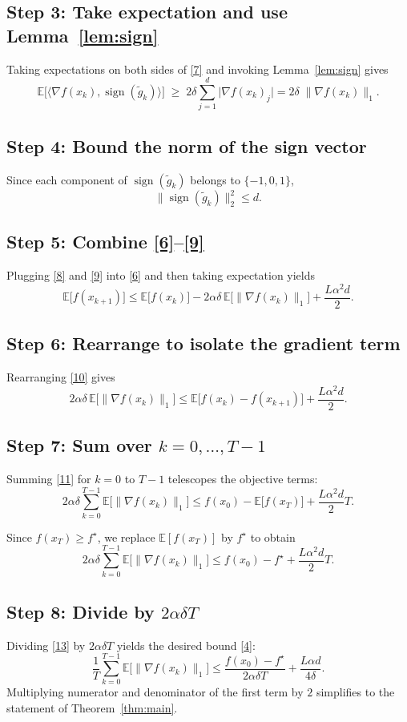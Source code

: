 \documentclass{article}
\newcommand{\sign}{\operatorname{sign}}
\newcommand{\E}{\mathbb{E}}
\begin{document}
\subsection*{Step 3: Take expectation and use Lemma~\ref{lem:sign}}
Taking expectations on both sides of \eqref{7} and invoking Lemma~\ref{lem:sign} gives
\[
\E\bigl[\langle\nabla f(x_{k}),\sign(\tilde g_{k})\rangle\bigr]
\;\ge\;2\delta\sum_{j=1}^{d}\bigl|\nabla f(x_{k})_{j}\bigr|
=2\delta\;\|\nabla f(x_{k})\|_{1}.
\tag{8}
\]

\subsection*{Step 4: Bound the norm of the sign vector}
Since each component of $\sign(\tilde g_{k})$ belongs to $\{-1,0,1\}$,
\[
\|\sign(\tilde g_{k})\|_{2}^{2}\le d.
\tag{9}
\]

\subsection*{Step 5: Combine \eqref{6}–\eqref{9}}
Plugging \eqref{8} and \eqref{9} into \eqref{6} and then taking expectation yields
\[
\E\bigl[f(x_{k+1})\bigr]
\le \E\bigl[f(x_{k})\bigr]
-2\alpha\delta\,\E\!\bigl[\|\nabla f(x_{k})\|_{1}\bigr]
+\frac{L\alpha^{2}d}{2}.
\tag{10}
\]

\subsection*{Step 6: Rearrange to isolate the gradient term}
Rearranging \eqref{10} gives
\[
2\alpha\delta\,\E\!\bigl[\|\nabla f(x_{k})\|_{1}\bigr]
\le \E\bigl[f(x_{k})-f(x_{k+1})\bigr]
+\frac{L\alpha^{2}d}{2}.
\tag{11}
\]

\subsection*{Step 7: Sum over $k=0,\dots,T-1$}
Summing \eqref{11} for $k=0$ to $T-1$ telescopes the objective terms:
\[
2\alpha\delta\sum_{k=0}^{T-1}\E\!\bigl[\|\nabla f(x_{k})\|_{1}\bigr]
\le f(x_{0})- \E\bigl[f(x_{T})\bigr] + \frac{L\alpha^{2}d}{2}T.
\tag{12}
\]

Since $f(x_{T})\ge f^{\star}$, we replace $\E[f(x_{T})]$ by $f^{\star}$ to obtain
\[
2\alpha\delta\sum_{k=0}^{T-1}\E\!\bigl[\|\nabla f(x_{k})\|_{1}\bigr]
\le f(x_{0})-f^{\star}+ \frac{L\alpha^{2}d}{2}T.
\tag{13}
\]

\subsection*{Step 8: Divide by $2\alpha\delta T$}
Dividing \eqref{13} by $2\alpha\delta T$ yields the desired bound \eqref{4}:
\[
\frac{1}{T}\sum_{k=0}^{T-1}\E\!\bigl[\|\nabla f(x_{k})\|_{1}\bigr]
\le
\frac{f(x_{0})-f^{\star}}{2\alpha\delta T}
+\frac{L\alpha d}{4\delta}.
\]
Multiplying numerator and denominator of the first term by $2$ simplifies to the statement of Theorem~\ref{thm:main}. \hfill\qedsymbol
\end{document}
